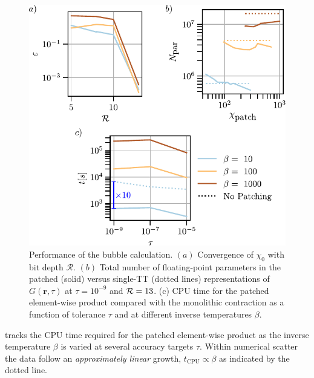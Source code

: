 \begin{figure}[htpb]
    \centering
    \includegraphics{figures/convergenceBubble.pdf}
    \caption{Performance of the bubble calculation.
    $(a)$ Convergence of \(\chi_{0}\) with bit depth \(\mathcal R\).
    $(b)$ Total number of floating-point parameters in the patched (solid) versus single-TT (dotted lines) representations of \(G(\mathbf r,\tau)\) at \(\tau=10^{-9}\) and $\mathcal{R}=13$.
    (c) CPU time for the patched element-wise product compared with the monolithic contraction as a function of tolerance \(\tau\) and at different inverse temperatures \(\beta\).}
    \label{fig:bubbleResults}
\end{figure}

 tracks the CPU time required for the patched element-wise product as the inverse temperature \(\beta\) is varied
at several accuracy targets \(\tau\).
Within numerical scatter the data follow an \emph{approximately linear} growth, \(t_{\text{CPU}}\propto\beta\) as indicated by the dotted line.

